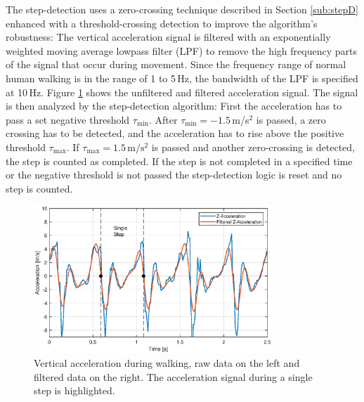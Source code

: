 \documentclass[engproc,conferenceproceedings,submit,pdftex,moreauthors]{Definitions/mdpi}
\begin{document}
 The step-detection uses a zero-crossing technique described in Section \ref{sub:stepD} enhanced with a threshold-crossing detection to improve the algorithm's robustness: The vertical acceleration signal is filtered with an exponentially weighted moving average lowpass filter (LPF) to remove the high frequency parts of the signal that occur during movement. Since the frequency range of normal human walking is in the range of 1 to 5\,Hz, the bandwidth of the LPF is specified at 10\,Hz. Figure \ref{fig:AccelWalk} shows the unfiltered and filtered acceleration signal. The signal is then analyzed by the step-detection algorithm: First the acceleration has to pass a set negative threshold $\tau_{\min}$. After $\tau_{\min} = -1.5$\,m/s$^2$ is passed, a zero crossing has to be detected, and the acceleration has to rise above the positive threshold $\tau_{\max}$. If $\tau_{\max} = 1.5\,\mathrm{m/s^2}$ is passed and another zero-crossing is detected, the step is counted as completed. If the step is not completed in a specified time or the negative threshold is not passed the step-detection logic is reset and no step is counted. 
\begin{figure}[h!]
	\centering
	\includegraphics[width=0.8\textwidth]{WalkAcceleration.eps}
	\caption{Vertical acceleration during walking, raw data on the left and filtered data on the right. The acceleration signal during a single step is highlighted.}
	\label{fig:AccelWalk}
\end{figure}


%	
\end{document}
